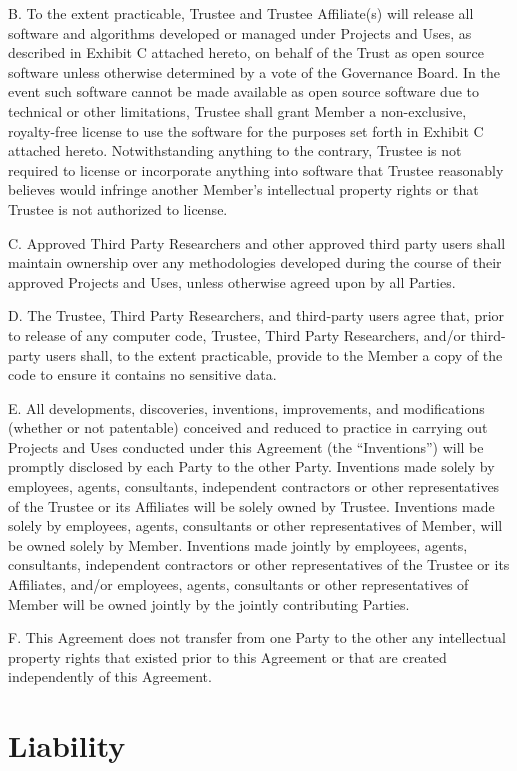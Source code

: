 \documentclass[]{book}
\begin{document}
B. To the extent practicable, Trustee and Trustee Affiliate(s) will release all software and algorithms developed or managed under Projects and Uses, as described in Exhibit C attached hereto, on behalf of the Trust as open source software unless otherwise determined by a vote of the Governance Board. In the event such software cannot be made available as open source software due to technical or other limitations, Trustee shall grant Member a non-exclusive, royalty-free license to use the software for the purposes set forth in Exhibit C attached hereto. Notwithstanding anything to the contrary, Trustee is not required to license or incorporate anything into software that Trustee reasonably believes would infringe another Member's intellectual property rights or that Trustee is not authorized to license.

C. Approved Third Party Researchers and other approved third party users shall maintain ownership over any methodologies developed during the course of their approved Projects and Uses, unless otherwise agreed upon by all Parties.

D. The Trustee, Third Party Researchers, and third-party users agree that, prior to release of any computer code, Trustee, Third Party Researchers, and/or third-party users shall, to the extent practicable, provide to the Member a copy of the code to ensure it contains no sensitive data.

E. All developments, discoveries, inventions, improvements, and modifications (whether or not patentable) conceived and reduced to practice in carrying out Projects and Uses conducted under this Agreement (the ``Inventions'') will be promptly disclosed by each Party to the other Party. Inventions made solely by employees, agents, consultants, independent contractors or other representatives of the Trustee or its Affiliates will be solely owned by Trustee. Inventions made solely by employees, agents, consultants or other representatives of Member, will be owned solely by Member. Inventions made jointly by employees, agents, consultants, independent contractors or other representatives of the Trustee or its Affiliates, and/or employees, agents, consultants or other representatives of Member will be owned jointly by the jointly contributing Parties.

F. This Agreement does not transfer from one Party to the other any intellectual property rights that existed prior to this Agreement or that are created independently of this Agreement.

\hypertarget{liability}{%
\chapter{Liability}\label{liability}}
\end{document}
